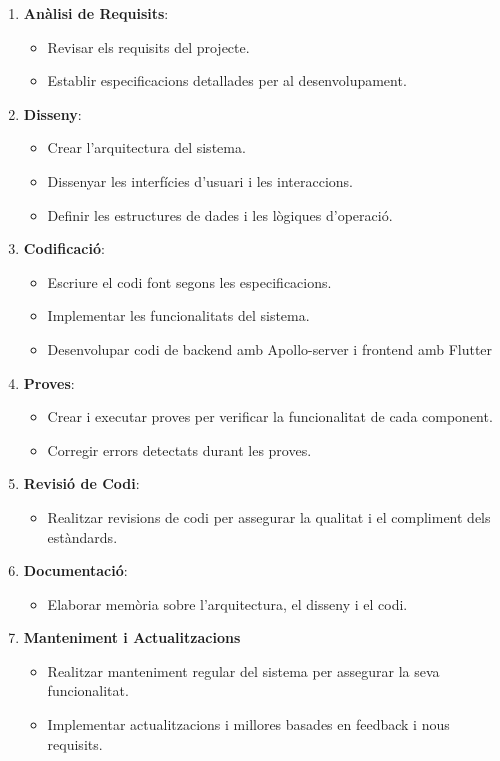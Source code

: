 \documentclass[a4paper,12pt,twoside]{ThesisStyle}
\begin{document}
\begin{enumerate}
  \item \textbf{Anàlisi de Requisits}:
  \begin{itemize}
      \item Revisar els requisits del projecte.
      \item Establir especificacions detallades per al desenvolupament.
  \end{itemize}

  \item \textbf{Disseny}:
  \begin{itemize}
      \item Crear l'arquitectura del sistema.
      \item Dissenyar les interfícies d'usuari i les interaccions.
      \item Definir les estructures de dades i les lògiques d'operació.
  \end{itemize}

  \item \textbf{Codificació}:
  \begin{itemize}
      \item Escriure el codi font segons les especificacions.
      \item Implementar les funcionalitats del sistema.
      \item Desenvolupar codi de backend amb Apollo-server i frontend amb Flutter
  \end{itemize}

  \item \textbf{Proves}:
  \begin{itemize}
      \item Crear i executar proves per verificar la funcionalitat de cada component.
      \item Corregir errors detectats durant les proves.
  \end{itemize}

  \item \textbf{Revisió de Codi}:
  \begin{itemize}
      \item Realitzar revisions de codi per assegurar la qualitat i el compliment dels estàndards.
  \end{itemize}

  \item \textbf{Documentació}:
  \begin{itemize}
      \item Elaborar memòria sobre l’arquitectura, el disseny i el codi.
  \end{itemize}

  \item \textbf{Manteniment i Actualitzacions}
    \begin{itemize}
        \item Realitzar manteniment regular del sistema per assegurar la seva funcionalitat.
        \item Implementar actualitzacions i millores basades en feedback i nous requisits.
    \end{itemize}


\end{enumerate}
\end{document}

